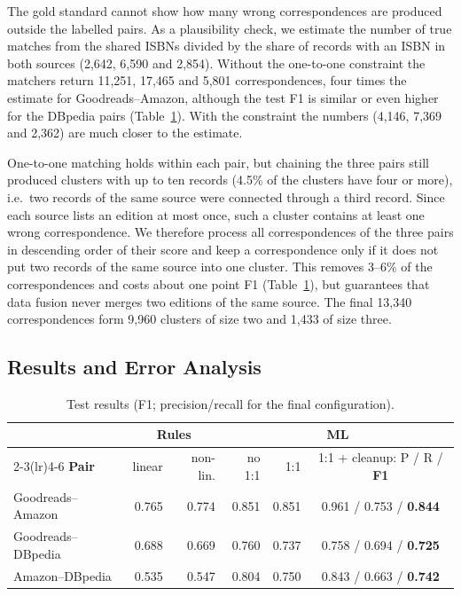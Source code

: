 \documentclass[runningheads]{llncs}
\begin{document}
The gold standard cannot show how many wrong correspondences are produced
outside the labelled pairs. As a plausibility check, we estimate the number of
true matches from the shared ISBNs divided by the share of records with an ISBN
in both sources (2,642, 6,590 and 2,854). Without the one-to-one constraint the
matchers return 11,251, 17,465 and 5,801 correspondences, four times the
estimate for Goodreads--Amazon, although the test F1 is similar or even higher
for the DBpedia pairs (Table~\ref{tab:irresults}). With the constraint the
numbers (4,146, 7,369 and 2,362) are much closer to the estimate.

One-to-one matching holds within each pair, but chaining the three pairs still
produced clusters with up to ten records (4.5\% of the clusters have four or
more), i.e.\ two records of the same source were connected through a third
record. Since each source lists an edition at most once, such a cluster contains
at least one wrong correspondence. We therefore process all correspondences of
the three pairs in descending order of their score and keep a correspondence
only if it does not put two records of the same source into one cluster. This
removes 3--6\% of the correspondences and costs about one point F1
(Table~\ref{tab:irresults}), but guarantees that data fusion never merges two
editions of the same source. The final 13,340 correspondences form 9,960
clusters of size two and 1,433 of size three.

\subsection{Results and Error Analysis}\label{sec:irresults}

\begin{table}[htbp]
\centering
\caption{Test results (F1; precision/recall for the final configuration).}
\label{tab:irresults}
\footnotesize\setlength{\tabcolsep}{4pt}
\begin{tabular}{lrrrrc}
\toprule
 & \multicolumn{2}{c}{\textbf{Rules}} & \multicolumn{3}{c}{\textbf{ML}} \\
\cmidrule(lr){2-3}\cmidrule(lr){4-6}
\textbf{Pair} & linear & non-lin. & no 1:1 & 1:1 & 1:1 + cleanup: P / R / \textbf{F1} \\
\midrule
Goodreads--Amazon  & 0.765 & 0.774 & 0.851 & 0.851 & 0.961 / 0.753 / \textbf{0.844} \\
Goodreads--DBpedia & 0.688 & 0.669 & 0.760 & 0.737 & 0.758 / 0.694 / \textbf{0.725} \\
Amazon--DBpedia    & 0.535 & 0.547 & 0.804 & 0.750 & 0.843 / 0.663 / \textbf{0.742} \\
\bottomrule
\end{tabular}
\end{table}
\end{document}
